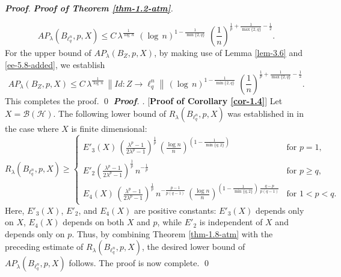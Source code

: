 \documentclass[a4paper,11pt, reqno]{amsart}
\theoremstyle{definition}
\newenvironment{pf}[1][]{%
	\vskip 3mm
	\noindent
	\ifthenelse{\equal{#1}{}}%
	{{\slshape {\bf Proof}. }}%
	{{\slshape #1.} }%
}%
{\qed\bigskip}
\newcommand{\norm}[1]{\left\lVert#1\right\rVert}
\begin{document}
\begin{pf}[{\bf Proof of Theorem \ref{thm-1.2-atm}}]
\begin{equation}
AP_{\lambda}(B_{\ell^n_q}, p,X) \leq C\, \lambda^{\frac{1}{\log\,n}}\,\, (\log\,n)^{1-\frac{1}{\min\{2,q\}}}\,\,\left(\frac{1}{n}\right)^{\frac{1}{p}+\frac{1}{\max\{2,q\}}-\frac{1}{2}}.
\end{equation}
For the upper bound of $AP_{\lambda}(B_{Z}, p,X)$, by making use of Lemma \ref{lem-3.6} and \eqref{ee-5.8-added}, we establish
\begin{equation*}
AP_{\lambda}(B_{Z}, p,X) \leq C\, \lambda^{\frac{1}{\log\,n}}\, \norm{Id:Z \rightarrow \ell^n_q}\, (\log\,n)^{1-\frac{1}{\min\{2,q\}}}\,\,\left(\frac{1}{n}\right)^{\frac{1}{p}+\frac{1}{\max\{2,q\}}-\frac{1}{2}}.
\end{equation*}
This completes the proof.
\end{pf}
\begin{pf} [{\bf Proof of Corollary \ref{cor-1.4}}]
Let $X=\mathcal{B}(\mathcal{H})$. The following lower bound of $R_{\lambda}(B_{\ell^n_q}, p,X)$ was established in \cite[Corollary 1.2]{Himadri-local-Banach-1} in the case where $X$ is finite dimensional:
\begin{equation*}
	R_{\lambda}(B_{\ell^n _q}, p,X) \geq	\begin{cases}
		E'_{3}(X)\,\left(\frac{\lambda^p -1}{2\lambda^p - 1}\right)^{\frac{1}{p}} \, \left(\frac{\log n}{n}\right)^{ \left(1- \frac{1}{\min\{q,2\}}\right)} & \text{for $p=1$}, \\[2mm]
		E'_{2} \left(\frac{\lambda^p -1}{2\lambda^p - 1}\right)^{\frac{1}{p}}\, n^{-\frac{1}{p}} & \text{for $p \geq q$}, \\[2mm]
		
		E_{4}(X)\,  \left(\frac{\lambda^p -1}{2\lambda^p - 1}\right)^{\frac{1}{p}} \,n^{-\frac{p-1}{p(q-1)}}\, \left( \frac{\log n}{n}\right)^{\left(1- \frac{1}{\min\{q,2\}}\right)\, \frac{q-p}{p(q-1)}} & \text{for $1<p< q$}. 
	\end{cases}
\end{equation*}
Here, $E'_{3}(X)$, $E'_{2}$, and $E_{4}(X)$ are positive constants: $E'_{3}(X)$ depends only on $X$, $E_{4}(X)$ depends on both $X$ and $p$, while $E'_{2}$ is independent of $X$ and depends only on $p$. Thus, by combining Theorem \ref{thm-1.8-atm} with the preceding estimate of $R_{\lambda}(B_{\ell^n_q}, p,X)$, the desired lower bound of $AP_{\lambda}(B_{\ell^n_q}, p,X)$ follows. The proof is now complete.
\end{pf}
\end{document}
